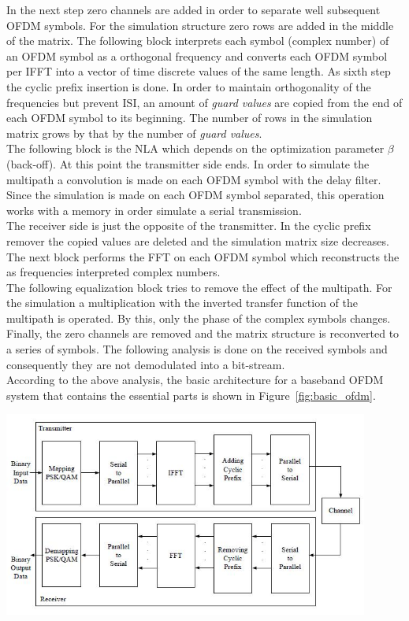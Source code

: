In the next step zero channels are added in order to separate well subsequent OFDM symbols. For the simulation structure zero rows are added in the middle of the matrix. The following block interprets each symbol (complex number) of an OFDM symbol as a orthogonal frequency and converts each OFDM symbol per IFFT into a vector of time discrete values of the same length. As sixth step the cyclic prefix insertion is done. In order to maintain orthogonality of the frequencies but prevent ISI, an amount of \textit{guard values} are copied from the end of each OFDM symbol to its beginning. The number of rows in the simulation matrix grows by that by the number of \textit{guard values}.\\
The following block is the NLA which depends on the optimization parameter $\beta$ (back-off). At this point the transmitter side ends. In order to simulate the multipath a convolution is made on each OFDM symbol with the delay filter. Since the simulation is made on each OFDM symbol separated, this operation works with a memory in order simulate a serial transmission.\\
The receiver side is just the opposite of the transmitter. In the cyclic prefix remover the copied values are deleted and the simulation matrix size decreases. The next block performs the FFT on each OFDM symbol which reconstructs the as frequencies interpreted complex numbers.\\ The following equalization block tries to remove the effect of the multipath. For the simulation a multiplication with the inverted transfer function of the multipath is operated. By this, only the phase of the complex symbols changes.\\ 
Finally, the zero channels are removed and the matrix structure is reconverted to a series of symbols. The following analysis is done on the received symbols and consequently they are not demodulated into a bit-stream.\\
According to the above analysis, the basic architecture for a baseband OFDM system that contains the essential parts is shown in Figure~\ref{fig:basic_ofdm}.\\

\begin{center}
\includegraphics[width=12cm]{content/fig/basic_ofdm_design.JPG}
\label{fig:basic_ofdm}
\end{center}

